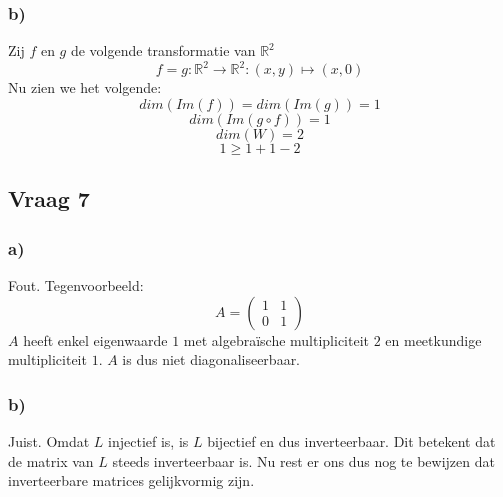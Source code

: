 \documentclass[lineaire_algebra_oplossingen.tex]{subfiles}
\begin{document}
\subsubsection*{b)}
Zij $f$ en $g$ de volgende transformatie van $\mathbb{R}^2$
\[
f = g : \mathbb{R}^2 \rightarrow \mathbb{R}^2: (x,y) \mapsto (x,0)
\]
Nu zien we het volgende:
\[
dim(Im(f)) = dim(Im(g)) = 1
\]
\[
dim(Im(g\circ f)) = 1
\]
\[
dim(W) = 2
\]
\[
1 \ge 1 + 1 - 2
\]

\subsection{Vraag 7}
\subsubsection*{a)}
Fout. Tegenvoorbeeld:\\
\[
A = 
\begin{pmatrix}
1 & 1\\
0 & 1
\end{pmatrix}
\]
$A$ heeft enkel eigenwaarde $1$ met algebra\"ische multipliciteit $2$ en meetkundige multipliciteit $1$. $A$ is dus niet diagonaliseerbaar.

\subsubsection*{b)}
Juist.
Omdat $L$ injectief is, is  $L$ bijectief en dus inverteerbaar. Dit betekent dat de matrix van $L$ steeds inverteerbaar is. Nu rest er ons dus nog te bewijzen dat inverteerbare matrices gelijkvormig zijn.
\end{document}
